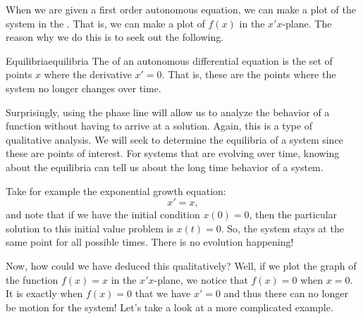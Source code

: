                 When we are given a first order autonomous equation, we can make a plot of the system in the . That is, we can make a plot of $f(x)$ in the $x'x$-plane.  The reason why we do this is to seek out the following.
                
                \begin{df}{Equilibria}{equilibria}
                    The  of an autonomous differential equation is the set of points $x$ where the derivative $x'=0$. That is, these are the points where the system no longer changes over time.
                \end{df}
                
                Surprisingly, using the phase line will allow us to analyze the behavior of a function without having to arrive at a solution. Again, this is a type of qualitative analysis. We will seek to determine the equilibria of a system since these are points of interest. For systems that are evolving over time, knowing about the equilibria can tell us about the long time behavior of a system.
                
                Take for example the exponential growth equation:
                \[
                x'=x,
                \]
                and note that if we have the initial condition $x(0)=0$, then the particular solution to this initial value problem is $x(t)=0$.  So, the system stays at the same point for all possible times.  There is no evolution happening!
                
                Now, how could we have deduced this qualitatively? Well, if we plot the graph of the function $f(x)=x$ in the $x'x$-plane, we notice that $f(x)=0$ when $x=0$.  It is exactly when $f(x)=0$ that we have $x'=0$ and thus there can no longer be motion for the system! Let's take a look at a more complicated example.

                
                
